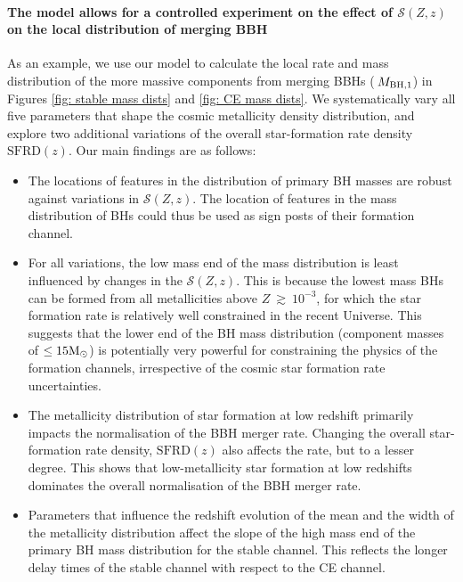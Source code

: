 \documentclass[linenumbers,twocolumn]{aastex631}
\newcommand{\Msun}{\ensuremath{\rm{M}_{\odot}}\xspace}
\newcommand{\Mbheen}{\ensuremath{\,M_{\rm BH, 1}}\xspace}
\newcommand{\SFRDzZ}{\ensuremath{\mathcal{S}(Z,z)}\xspace}
\newcommand{\SFRDz}{\ensuremath{\mathrm{SFRD}(z)}\xspace}
\begin{document}
\paragraph{The model allows for a controlled experiment on the effect of \SFRDzZ on the local distribution of merging BBH}
As an example, we use our model to calculate the local rate and mass distribution of the more massive components from merging BBHs (\Mbheen) in Figures \ref{fig: stable mass dists} and \ref{fig: CE mass dists}.
We systematically vary all five parameters that shape the cosmic metallicity density distribution, and explore two additional variations of the overall star-formation rate density \SFRDz.
Our main findings are as follows:
\begin{itemize}
    
    \item The locations of features in the distribution of primary BH masses are robust against variations in \SFRDzZ. The location of features in the mass distribution of BHs could thus be used as sign posts of their formation channel. 
    
    \item For all variations, the low mass end of the mass distribution is least influenced by changes in the \SFRDzZ.
    This is because the lowest mass BHs can be formed from all metallicities above $Z~\gtrsim~10^{-3}$, for which the star formation rate is relatively well constrained in the recent Universe. 
    This suggests that the lower end of the BH mass distribution (component masses of $\leq 15\Msun$) is potentially very powerful for constraining the physics of the formation channels, irrespective of the cosmic star formation rate uncertainties.
    
    \item The metallicity distribution of star formation at low redshift primarily impacts the normalisation of the BBH merger rate. Changing the overall star-formation rate density, \SFRDz also affects the rate, but to a lesser degree. This shows that low-metallicity star formation at low redshifts dominates the overall normalisation of the BBH merger rate. 
    
    \item Parameters that influence the redshift evolution of the mean and the width of the metallicity distribution affect the slope of the high mass end of the primary BH mass distribution for the stable channel. This reflects the longer delay times of the stable channel with respect to the CE channel. 
    
\end{itemize}
\end{document}
